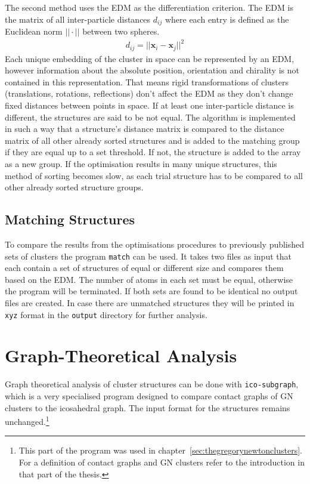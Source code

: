The second method uses the \ac{EDM} as the differentiation criterion. The
\ac{EDM} is the matrix of all inter-particle distances $d_{ij}$ where
each entry is defined as the Euclidean norm $||\cdot||$ between two spheres.
%
\begin{align}
    d_{ij}=||\mathbf{x}_i-\mathbf{x}_j||^2
\end{align}
%
Each unique embedding of the cluster in space can be represented by an \ac{EDM},
however information about the absolute position, orientation and chirality is
not contained in this representation. That means rigid transformations of
clusters (translations, rotations, reflections) don't affect the \ac{EDM} as
they don't change fixed distances between points in
space.\autocite{Dokmanic_EuclideanDistanceMatrices_2015} If at least one
inter-particle distance is different, the structures are said to be not equal.
The algorithm is implemented in such a way that a structure's distance matrix is
compared to the distance matrix of all other already sorted structures and is
added to the matching group if they are equal up to a set threshold. If not, the
structure is added to the array as a new group. If the optimisation results in
many unique structures, this method of sorting becomes slow, as each trial
structure has to be compared to all other already sorted structure groups.

\subsection{Matching Structures}
\label{sec:matchingstructures}

To compare the results from the optimisations procedures to previously
published sets of clusters the program \verb|match| can be used. It takes two
files as input that each contain a set of structures of equal or different size
and compares them based on the \ac{EDM}. The number of atoms in each set must
be equal, otherwise the program will be terminated. If both sets are found to
be identical no output files are created. In case there are unmatched
structures they will be printed in \verb|xyz| format in the \verb|output|
directory for further analysis.

\section{Graph-Theoretical Analysis}
\label{sec:GraphTheoreticalAnalysis}

Graph theoretical analysis of cluster structures can be done with
\verb|ico-subgraph|, which is a very specialised program designed to compare
contact graphs of \ac{GN} clusters to the icosahedral graph. The input format
for the structures remains unchanged.\footnote{This part of the program was used
in chapter~\ref{sec:thegregorynewtonclusters}. For a definition of contact
graphs and \ac{GN} clusters refer to the introduction in that part of the
thesis.}

